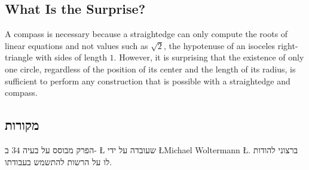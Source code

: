 
\subsection*{What Is the Surprise?}

A compass is necessary because a straightedge can only compute the roots of linear equations and not values such as $\sqrt{2}$, the hypotenuse of an isoceles right-triangle with sides of length $1$. However, it is surprising that the existence of only one circle, regardless of the position of its center and the length of its radius, is sufficient to perform any construction that is possible with a straightedge and compass.


\subsection*{מקורות}
הפרק מבוסס על בעיה
$34$
ב-%
\L{\cite{dorrie1}}
שעובדה על ידי
\L{Michael Woltermann} \L{\cite{dorrie2}}. 
ברצוני להודות לו על הרשות להתשמש בעבודתו.


